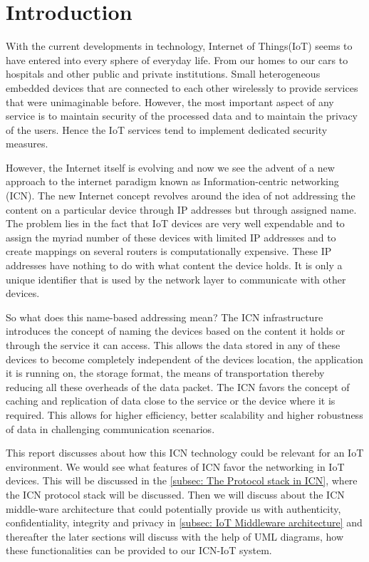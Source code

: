 \section{Introduction}

With the current developments  in technology, Internet of Things(IoT) seems to have entered into every sphere of everyday life. From our homes to our cars to hospitals and other public and private institutions. Small heterogeneous embedded devices that are connected to each other wirelessly to provide services that were unimaginable before. However, the most important aspect of any service is to maintain security of the processed data and to maintain the privacy of the users. Hence the IoT services tend to implement dedicated security measures.\par
However, the Internet itself is evolving and now we see the advent of a new approach to the internet paradigm known as Information-centric networking (ICN). The new Internet concept revolves around the idea of not addressing the content on a particular device through IP addresses but through assigned name. The problem lies in the fact that IoT devices are very well expendable and to assign the myriad number of these devices with limited IP addresses and to create mappings on several routers is computationally expensive. These IP addresses have nothing to do with what content the device holds. It is only a unique identifier that is used by the network layer to communicate with other devices. \par
So what does this name-based addressing mean? The ICN infrastructure introduces the concept of naming the devices based on the content it holds or through the service it can access. This allows the data stored in any of these devices to become completely independent of the devices location, the application it is running on, the storage format, the means of transportation thereby reducing all these overheads of the data packet. The ICN favors the concept of caching and replication of data close to the service or the device where it is required. This allows for higher efficiency, better scalability and higher robustness of data in challenging communication scenarios. \par
This report discusses about how this ICN technology could be relevant for an IoT environment. We would see what features of ICN favor the networking in IoT devices. This will be discussed in the \ref{subsec: The Protocol stack in ICN}, where the ICN protocol stack will be discussed. Then we will discuss about the ICN middle-ware architecture that could potentially provide us with authenticity, confidentiality, integrity and privacy in \ref{subsec: IoT Middleware architecture} and thereafter the later sections will discuss with the help of UML diagrams, how these functionalities can be provided to our ICN-IoT system. \par
